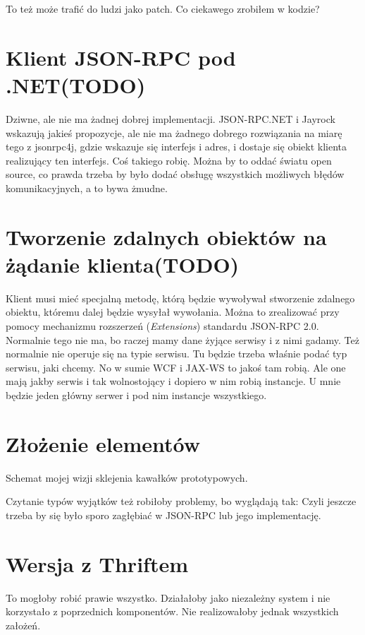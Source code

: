 To też może trafić do ludzi jako patch.
Co ciekawego zrobiłem w kodzie?



\section{Klient JSON-RPC pod .NET(TODO)}
Dziwne, ale nie ma żadnej dobrej implementacji. JSON-RPC.NET i Jayrock wskazują jakieś propozycje, ale nie ma żadnego dobrego rozwiązania na miarę tego z jsonrpc4j, gdzie wskazuje się interfejs i adres, i dostaje się obiekt klienta realizujący ten interfejs.
Coś takiego robię. Można by to oddać światu open source, co prawda trzeba by było dodać obsługę wszystkich możliwych błędów komunikacyjnych, a to bywa żmudne.



\section{Tworzenie zdalnych obiektów na żądanie klienta(TODO)}
Klient musi mieć specjalną metodę, którą będzie wywoływał stworzenie zdalnego obiektu, któremu dalej będzie wysyłał wywołania.
Można to zrealizować przy pomocy mechanizmu rozszerzeń (\emph{Extensions}) standardu JSON-RPC 2.0.
Normalnie tego nie ma, bo raczej mamy dane żyjące serwisy i z nimi gadamy. Też normalnie nie operuje się na typie serwisu. Tu będzie trzeba właśnie podać typ serwisu, jaki chcemy. No w sumie WCF i JAX-WS to jakoś tam robią. Ale one mają jakby serwis i tak wolnostojący i dopiero w nim robią instancje. U mnie będzie jeden główny serwer i pod nim instancje wszystkiego.



\section{Złożenie elementów}
Schemat mojej wizji sklejenia kawałków prototypowych.

Czytanie typów wyjątków też robiłoby problemy, bo wyglądają tak:
Czyli jeszcze trzeba by się było sporo zagłębiać w JSON-RPC lub jego implementację.

\section{Wersja z Thriftem}
To mogłoby robić prawie wszystko. Działałoby jako niezależny system i nie korzystało z poprzednich komponentów. Nie realizowałoby jednak wszystkich założeń.